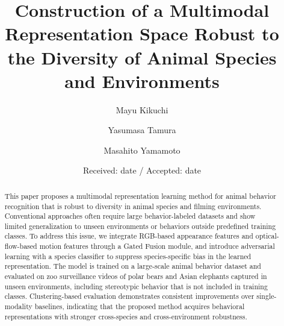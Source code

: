 \documentclass[twocolumn]{svjour3}
\begin{document}
\title{Construction of a Multimodal Representation Space Robust to
the Diversity of Animal Species and Environments}


\author{Mayu Kikuchi \and
        Yasumasa Tamura \and
        Masahito Yamamoto}



\date{Received: date / Accepted: date}

\maketitle

\begin{abstract}
This paper proposes a multimodal representation learning method for animal behavior recognition that is robust to diversity in animal species and filming environments. Conventional approaches often require large behavior-labeled datasets and show limited generalization to unseen environments or behaviors outside predefined training classes. To address this issue, we integrate RGB-based appearance features and optical-flow-based motion features through a Gated Fusion module, and introduce adversarial learning with a species classifier to suppress species-specific bias in the learned representation. The model is trained on a large-scale animal behavior dataset and evaluated on zoo surveillance videos of polar bears and Asian elephants captured in unseen environments, including stereotypic behavior that is not included in training classes. Clustering-based evaluation demonstrates consistent improvements over single-modality baselines, indicating that the proposed method acquires behavioral representations with stronger cross-species and cross-environment robustness.
\end{abstract}
\end{document}
